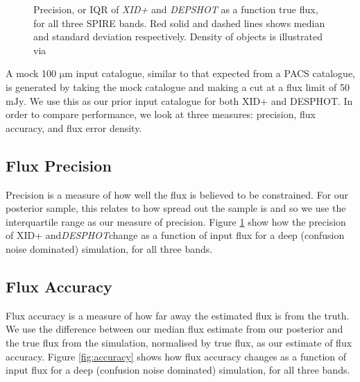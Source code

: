 \documentclass[useAMS,usenatbib]{mnras}
\begin{document}
\begin{figure}
\caption{Precision, or IQR of \emph{XID+} and \emph{DEPSHOT} as a function true flux, for all three SPIRE bands. Red solid and dashed lines shows median and standard deviation respectively. Density of objects is illustrated via }\label{fig:precision}
\end{figure}

A mock 100 $\mathrm{\mu m}$ input catalogue, similar to that expected from a PACS catalogue, is generated by taking the mock catalogue and making a cut at a flux limit of 50 $\mathrm{mJy}$. We use this as our prior input catalogue for both XID+ and DESPHOT. In order to compare performance, we look at three measures: precision, flux accuracy, and flux error density.

\subsection{Flux Precision}
Precision is a measure of how well the flux is believed to be constrained. For our posterior sample, this relates to how spread out the sample is and so we use the interquartile range as our measure of precision. Figure \ref{fig:precision} show how the precision of XID+ and\emph{DESPHOT}change as a function of input flux for a deep (confusion noise dominated) simulation, for all three bands. 

\subsection{Flux Accuracy}
Flux accuracy is a measure of how far away the estimated flux is from the truth. We use the difference between our median flux estimate from our posterior and the true flux from the simulation, normalised by true flux, as our estimate of flux accuracy. Figure \ref{fig:accuracy} shows how flux accuracy changes as a function of input flux for a deep (confusion noise dominated) simulation, for all three bands. 
\end{document}

